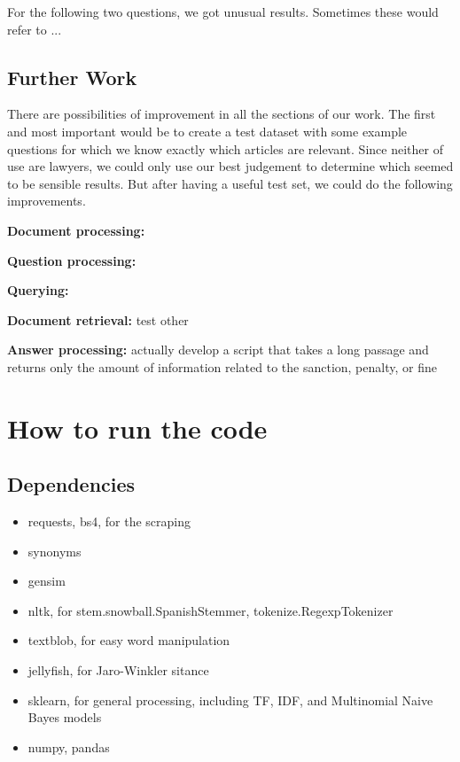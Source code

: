 \documentclass[letterpaper, margin=1in]{article}
\begin{document}
For the following two questions, we got unusual results. Sometimes these would refer to ...
 
\subsection{Further Work}
There are possibilities of improvement in all the sections of our work. The first and most important would be to create a test dataset with some example questions for which we know exactly which articles are relevant. Since neither of use are lawyers, we could only use our best judgement to determine which seemed to be sensible results. But after having a useful test set, we could do the following improvements.
\begin{description}
\item \textbf{Document processing:} 
\item \textbf{Question processing:} 
\item \textbf{Querying:} 
\item \textbf{Document retrieval:} test other 
\item \textbf{Answer processing:} actually develop a script that takes a long passage and returns only the amount of information related to the sanction, penalty, or fine
\end{description}

\newpage
\section{How to run the code}

\subsection{Dependencies}
\begin{itemize}
\item requests, bs4, for the scraping
\item synonyms
\item gensim 
\item nltk, for stem.snowball.SpanishStemmer, tokenize.RegexpTokenizer
\item textblob, for easy word manipulation
\item jellyfish, for Jaro-Winkler sitance
\item sklearn, for general processing, including TF, IDF, and Multinomial Naive Bayes models
\item numpy, pandas
\end{itemize}
\end{document}
